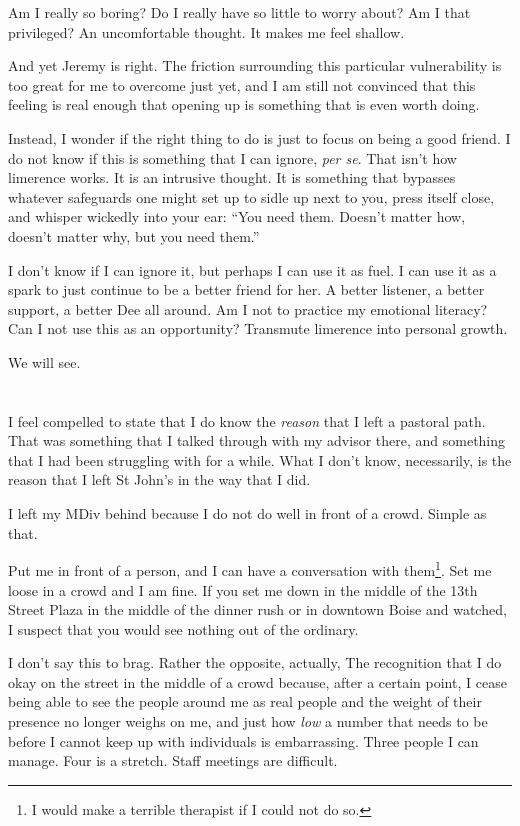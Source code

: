Am I really so boring? Do I really have so little to worry about? Am I that privileged? An uncomfortable thought. It makes me feel shallow.

And yet Jeremy is right. The friction surrounding this particular vulnerability is too great for me to overcome just yet, and I am still not convinced that this feeling is real enough that opening up is something that is even worth doing.

Instead, I wonder if the right thing to do is just to focus on being a good friend. I do not know if this is something that I can ignore, \emph{per se}. That isn't how limerence works. It is an intrusive thought. It is something that bypasses whatever safeguards one might set up to sidle up next to you, press itself close, and whisper wickedly into your ear: ``You need them. Doesn't matter how, doesn't matter why, but you need them.''

I don't know if I can ignore it, but perhaps I can use it as fuel. I can use it as a spark to just continue to be a better friend for her. A better listener, a better support, a better Dee all around. Am I not to practice my emotional literacy? Can I not use this as an opportunity? Transmute limerence into personal growth.

We will see.

\section{}

I feel compelled to state that I do know the \emph{reason} that I left a pastoral path. That was something that I talked through with my advisor there, and something that I had been struggling with for a while. What I don't know, necessarily, is the reason that I left St John's in the way that I did.

I left my MDiv behind because I do not do well in front of a crowd. Simple as that.

Put me in front of a person, and I can have a conversation with them\footnote{I would make a terrible therapist if I could not do so.}. Set me loose in a crowd and I am fine. If you set me down in the middle of the 13th Street Plaza in the middle of the dinner rush or in downtown Boise and watched, I suspect that you would see nothing out of the ordinary.

I don't say this to brag. Rather the opposite, actually, The recognition that I do okay on the street in the middle of a crowd because, after a certain point, I cease being able to see the people around me as real people and the weight of their presence no longer weighs on me, and just how \emph{low} a number that needs to be before I cannot keep up with individuals is embarrassing. Three people I can manage. Four is a stretch. Staff meetings are difficult.


